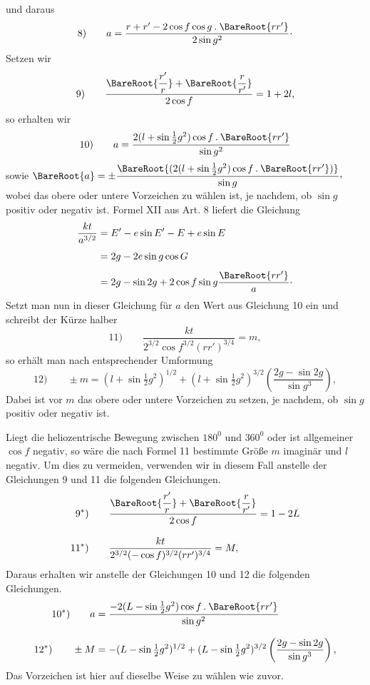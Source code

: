 und daraus
\[
\mathrm{8)}\qquad a=\frac{r+r'-2\cos f\cos g\mathbin{.}\BareRoot{rr'}}{2\sin g^2}\mathpunct{\cdot}
\]
Setzen wir
\[
\mathrm{9)}\qquad\frac{\BareRoot{\dfrac{r'}r}+\BareRoot{\dfrac{r}{r'}}}{2\cos f}=1+2l,
\]
so erhalten wir
\[
\mathrm{10)}\qquad a=\frac{2(l+\sin\tfrac12g^2)\cos f\mathbin{.}\BareRoot{rr'}}{\sin g^2}
\]
sowie $\BareRoot{a}=\pm\dfrac{\BareRoot{(2(l+\sin\tfrac12g^2)\cos f\mathbin{.}\BareRoot{rr'})}}{\sin g}\mathpunct{\raisebox{.45ex}{,}}$ wobei das obere oder untere Vorzeichen zu wählen ist, je nachdem, ob $\sin g$ positiv oder negativ ist. Formel XII aus Art. 8 liefert die Gleichung
\[
\begin{aligned}
\frac{kt}{a^{3/2}}&=E'-e\sin E'-E+e\sin E\\[4pt]
&=2g-2e\sin g\cos G\\[4pt]
&=2g-\sin2g+2\cos f\sin g\frac{\BareRoot{rr'}}a\mathpunct{\cdot}
\end{aligned}
\]
Setzt man nun in dieser Gleichung für $a$ den Wert aus Gleichung 10 ein und schreibt der Kürze halber
\[
\mathrm{11)}\qquad\frac{kt}{2^{3/2}\cos f^{3/2}(rr')^{3/4}}=m,
\]
so erhält man nach entsprechender Umformung
\[
\mathrm{12)}\qquad\pm m=(l+\sin\tfrac12g^2)^{1/2}+(l+\sin\tfrac12g^2)^{3/2}\left(\frac{2g-\sin2g}{\sin g^3}\right),
\]
Dabei ist vor $m$ das obere oder untere Vorzeichen zu setzen, je nachdem, ob $\sin g$ positiv oder negativ ist.

Liegt die heliozentrische Bewegung zwischen $180^0$ und $360^0$ oder ist allgemeiner $\cos f$ negativ, so wäre die nach Formel 11 bestimmte Größe $m$ imaginär und $l$ negativ. Um dies zu vermeiden, verwenden wir in diesem Fall anstelle der Gleichungen 9 und 11 die folgenden Gleichungen.
\[
\begin{aligned}
\mathrm{9^*)}\qquad&\frac{\BareRoot{\dfrac{r'}r}+\BareRoot{\dfrac{r}{r'}}}{2\cos f}=1-2L\\[8pt]
\mathrm{11^*)}\qquad&\frac{kt}{2^{3/2}(-\cos f)^{3/2}(rr')^{3/4}}=M,
\end{aligned}
\]
Daraus erhalten wir anstelle der Gleichungen 10 und 12 die folgenden Gleichungen.
\[
\begin{aligned}
\mathrm{10^*)}\qquad a&=\frac{-2(L-\sin\tfrac12g^2)\cos f\mathbin{.}\BareRoot{rr'}}{\sin g^2}\\[8pt]
\mathrm{12^*)}\qquad\pm M&=-(L-\sin\tfrac12g^2)^{1/2}+(L-\sin\tfrac12g^2)^{3/2}\left(\frac{2g-\sin2g}{\sin g^3}\right),
\end{aligned}
\]
Das Vorzeichen ist hier auf dieselbe Weise zu wählen wie zuvor.
